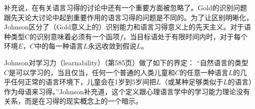  \citet{Johnson2004a}补充说，在有关语言习得的讨论中还有一个重要方面被忽略了。Gold的识别问题跟先天论大讨论中起到重要作用的语言习得的问题是不同的。为了让区别明晰化，Johnson区分了（Gold意义上的）识别能力和语言习得意义上的先天主义。对于语种类型C的识别意味着必须有一个函项$f$，当目标语处于有限时间内时，对于每个环境$E$，$C$中的每一种语言$L$永远收敛到假说$L$。

Johnson对学习力（learnability）（第585页）做了如下的界定：
“自然语言的类型$C$是可以学习的，当且仅当，任何一个普通的人类儿童和$C$的任意一种语言$L$的几乎任何正常的语言环境下，儿童会在1岁到5岁间把$L$（或某种足够类似于$L$的语言）作为母语来习得。”Johnson补充道，这个定义跟心理语言学中的学习能力理论没有关系，而是在习得的现实概念上的一个暗示。

